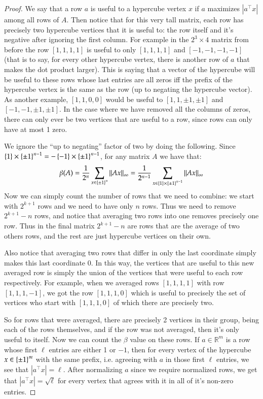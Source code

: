 \documentclass[12pt]{article}
\theoremstyle{definitionstyle}
\def\mbb#1{\mathbb{#1}}
\def\R{\mbb{R}}
\newcommand{\SET}[1]{\Set{\mskip-\medmuskip #1 \mskip-\medmuskip}}
\begin{document}
\begin{proof}
We say that a row $a$ is useful to a hypercube vertex $x$ if $a$ maximizes $|a^\top x|$ among all rows of $A$. Then notice that for this very tall matrix, each row has precisely two hypercube vertices that it is useful to: the row itself and it's negative after ignoring the first column. For example in the $2^3 \times 4$ matrix from before the row $[1, 1, 1, 1]$ is useful to only $[1, 1, 1, 1]$ and $[-1, -1, -1, -1]$ (that is to say, for every other hypercube vertex, there is another row of $a$ that makes the dot product larger). This is saying that a vector of the hypercube will be useful to these rows whose last entries are all zeros iff the prefix of the hypercube vertex is the same as the row (up to negating the hypercube vector). As another example, $[1, 1, 0, 0]$ would be useful to $[1, 1, \pm 1, \pm 1]$ and $[-1, -1, \pm 1, \pm 1]$. In the case where we have removed all the columns of zeros, there can only ever be two vertices that are useful to a row, since rows can only have at most 1 zero. 

We ignore the ``up to negating'' factor of two by doing the following. Since $\SET{1} \times \SET{\pm 1}^{n-1} = -\SET{-1} \times \SET{\pm 1}^{n-1}$, for any matrix $A$ we have that:
\begin{align*}
    \beta(A)=  \frac{1}{2^{n}} \sum_{x \in \SET{\pm 1}^{n}} \norm{Ax}_\infty = \frac{1}{2^{n-1}} \sum_{x \in \SET{1} \times \SET{\pm 1}^{n-1}} \norm{Ax}_\infty
\end{align*}
Now we can simply count the number of rows that we need to combine: we start with $2^{k+1}$ rows and we need to have only $n$ rows. Thus we need to remove $2^{k+1} - n$ rows, and notice that averaging two rows into one removes precisely one row. Thus in the final matrix $2^{k+1} - n$ are rows that are the average of two others rows, and the rest are just hypercube vertices on their own.

Also notice that averaging two rows that differ in only the last coordinate simply makes this last coordinate 0. In this way, the vertices that are useful to this new averaged row is simply the union of the vertices that were useful to each row respectively. For example, when we averaged rows $[1, 1, 1, 1]$ with row $[1, 1, 1, -1]$, we got the row $[1, 1, 1, 0]$ which is useful to precisely the set of vertices who start with $[1, 1, 1, 0]$ of which there are precisely two.

So for rows that were averaged, there are precisely 2 vertices in their group, being each of the rows themselves, and if the row was not averaged, then it's only useful to itself. Now we can count the $\beta$ value on these rows. If $a \in \R^m$ is a row whose first $\ell$ entries are either 1 or $-1$, then for every vertex of the hypercube $x \in \SET{\pm 1}^m$ with the same prefix, i.e. agreeing with $a$ in those first $\ell$ entries, we see that $|a^\top x| = \ell$. After normalizing $a$ since we require normalized rows, we get that $|a^\top x| = \sqrt{\ell}$ for every vertex that agrees with it in all of it's non-zero entries. 


\end{proof}
\end{document}
